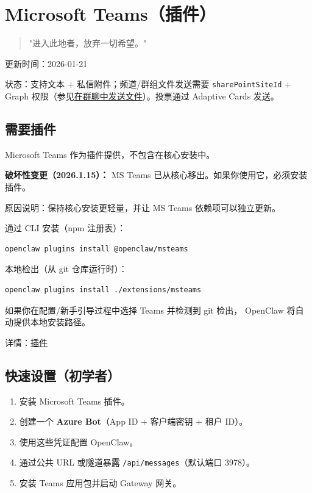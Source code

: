 \clearpage

\section{Microsoft Teams（插件）}


\begin{quote}
"进入此地者，放弃一切希望。"
\end{quote}


更新时间：2026-01-21

状态：支持文本 + 私信附件；频道/群组文件发送需要 \texttt{sharePointSiteId} + Graph 权限（参见\href{\#sending-files-in-group-chats}{在群聊中发送文件}）。投票通过 Adaptive Cards 发送。

\subsection{需要插件}


Microsoft Teams 作为插件提供，不包含在核心安装中。

\textbf{破坏性变更（2026.1.15）：} MS Teams 已从核心移出。如果你使用它，必须安装插件。

原因说明：保持核心安装更轻量，并让 MS Teams 依赖项可以独立更新。

通过 CLI 安装（npm 注册表）：

\begin{lstlisting}[language=bash]
openclaw plugins install @openclaw/msteams
\end{lstlisting}


本地检出（从 git 仓库运行时）：

\begin{lstlisting}[language=bash]
openclaw plugins install ./extensions/msteams
\end{lstlisting}


如果你在配置/新手引导过程中选择 Teams 并检测到 git 检出，
OpenClaw 将自动提供本地安装路径。

详情：\href{/tools/plugin}{插件}

\subsection{快速设置（初学者）}


\begin{enumerate}
  \item 安装 Microsoft Teams 插件。
  \item 创建一个 \textbf{Azure Bot}（App ID + 客户端密钥 + 租户 ID）。
  \item 使用这些凭证配置 OpenClaw。
  \item 通过公共 URL 或隧道暴露 \texttt{/api/messages}（默认端口 3978）。
  \item 安装 Teams 应用包并启动 Gateway 网关。
\end{enumerate}


